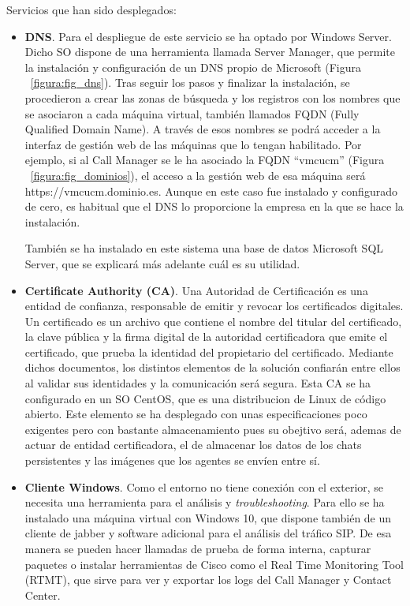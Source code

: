 \documentclass[a4paper, 12pt]{book}
\begin{document}
Servicios que han sido desplegados:
\begin{itemize}
  \item \textbf{DNS}. Para el despliegue de este servicio se ha optado por Windows Server. Dicho SO dispone de una herramienta llamada Server Manager, que permite la instalación y configuración de un DNS propio de Microsoft (Figura ~\ref{figura:fig_dns}). Tras seguir los pasos y finalizar la instalación, se procedieron a crear las zonas de búsqueda y los registros con los nombres que se asociaron a cada máquina virtual, también llamados FQDN (Fully Qualified Domain Name). A través de esos nombres se podrá acceder a la interfaz de gestión web de las máquinas que lo tengan habilitado. Por ejemplo, si al Call Manager se le ha asociado la FQDN ``vmcucm'' (Figura ~\ref{figura:fig_dominios}), el acceso a la gestión web de esa máquina será https://vmcucm.dominio.es. Aunque en este caso fue instalado y configurado de cero, es habitual que el DNS lo proporcione la empresa en la que se hace la instalación.
  
  También se ha instalado en este sistema una base de datos Microsoft SQL Server, que se explicará más adelante cuál es su utilidad.

  \item \textbf{Certificate Authority (CA)}. Una Autoridad de Certificación es una entidad de confianza, responsable de emitir y revocar los certificados digitales. Un certificado es un archivo que contiene el nombre del titular del certificado, la clave pública y la firma digital de la autoridad certificadora que emite el certificado, que prueba la identidad del propietario del certificado. 
  Mediante dichos documentos, los distintos elementos de la solución confiarán entre ellos al validar sus identidades y la comunicación será segura.
  Esta CA se ha configurado en un SO CentOS, que es una distribucion de Linux de código abierto.
  Este elemento se ha desplegado con unas especificaciones poco exigentes pero con bastante almacenamiento pues su obejtivo será, ademas de actuar de entidad certificadora, el de almacenar los datos de los chats persistentes y las imágenes que los agentes se envíen entre sí.

  \item \textbf{Cliente Windows}. Como el entorno no tiene conexión con el exterior, se necesita una herramienta para el análisis y \emph{troubleshooting}. Para ello se ha instalado una máquina virtual con Windows 10, que dispone también de un cliente de jabber y software adicional para el análisis del tráfico SIP. De esa manera se pueden hacer llamadas de prueba de forma interna, capturar paquetes o instalar herramientas de Cisco como el Real Time Monitoring Tool (RTMT), que sirve para ver y exportar los logs del Call Manager y Contact Center.
\end{itemize}
\end{document}
